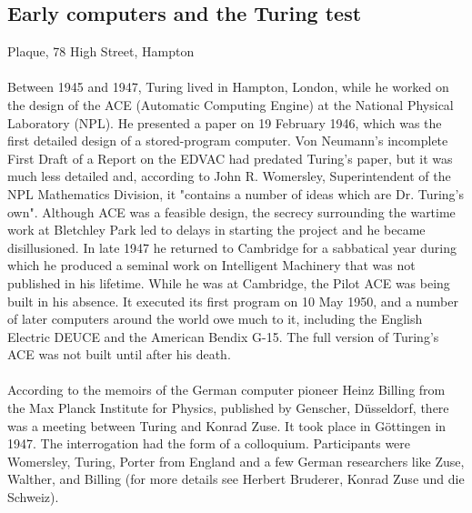 \documentclass{article}
\begin{document}
\subsection{Early computers and the Turing test}
Plaque, 78 High Street, Hampton
\\\\
Between 1945 and 1947, Turing lived in Hampton, London, while he worked on the design of the ACE (Automatic Computing Engine) at the National Physical Laboratory (NPL). He presented a paper on 19 February 1946, which was the first detailed design of a stored-program computer. Von Neumann's incomplete First Draft of a Report on the EDVAC had predated Turing's paper, but it was much less detailed and, according to John R. Womersley, Superintendent of the NPL Mathematics Division, it "contains a number of ideas which are Dr. Turing's own". Although ACE was a feasible design, the secrecy surrounding the wartime work at Bletchley Park led to delays in starting the project and he became disillusioned. In late 1947 he returned to Cambridge for a sabbatical year during which he produced a seminal work on Intelligent Machinery that was not published in his lifetime. While he was at Cambridge, the Pilot ACE was being built in his absence. It executed its first program on 10 May 1950, and a number of later computers around the world owe much to it, including the English Electric DEUCE and the American Bendix G-15. The full version of Turing's ACE was not built until after his death.
\\\\
According to the memoirs of the German computer pioneer Heinz Billing from the Max Planck Institute for Physics, published by Genscher, Düsseldorf, there was a meeting between Turing and Konrad Zuse. It took place in Göttingen in 1947. The interrogation had the form of a colloquium. Participants were Womersley, Turing, Porter from England and a few German researchers like Zuse, Walther, and Billing (for more details see Herbert Bruderer, Konrad Zuse und die Schweiz).
\\\\
\end{document}
